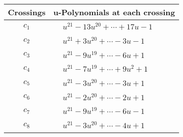 \documentclass[1p]{elsarticle_modified}
\theoremstyle{definition}
\begin{document}
\begin{tabular}{m{50pt}|m{274pt}}
Crossings & \hspace{64pt}u-Polynomials at each crossing \\
\hline $$\begin{aligned}c_{1}\end{aligned}$$&$\begin{aligned}
&u^{21}-13 u^{20}+\cdots+17 u-1
\end{aligned}$\\
\hline $$\begin{aligned}c_{2}\end{aligned}$$&$\begin{aligned}
&u^{21}+3 u^{20}+\cdots-3 u-1
\end{aligned}$\\
\hline $$\begin{aligned}c_{3}\end{aligned}$$&$\begin{aligned}
&u^{21}-9 u^{19}+\cdots-6 u+1
\end{aligned}$\\
\hline $$\begin{aligned}c_{4}\end{aligned}$$&$\begin{aligned}
&u^{21}-7 u^{19}+\cdots+9 u^2+1
\end{aligned}$\\
\hline $$\begin{aligned}c_{5}\end{aligned}$$&$\begin{aligned}
&u^{21}-3 u^{20}+\cdots-3 u+1
\end{aligned}$\\
\hline $$\begin{aligned}c_{6}\end{aligned}$$&$\begin{aligned}
&u^{21}-2 u^{20}+\cdots-2 u+1
\end{aligned}$\\
\hline $$\begin{aligned}c_{7}\end{aligned}$$&$\begin{aligned}
&u^{21}-9 u^{19}+\cdots-6 u-1
\end{aligned}$\\
\hline $$\begin{aligned}c_{8}\end{aligned}$$&$\begin{aligned}
&u^{21}-3 u^{20}+\cdots-4 u+1
\end{aligned}$\\

\end{tabular}
\end{document}
